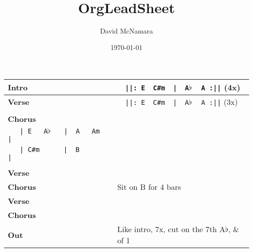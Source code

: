 \documentclass{LeadMemo}
\title{OrgLeadSheet}
\author{David McNamara}
\date{\today}
\begin{document}
\maketitle

\def\arraystretch{2.5}
\begin{tabular}[h]{ p{}  p{}  }
    \huge\textbf{Intro\vfill}         &\large\verb!  ||: E  C#m  |  A!$\flat\,$\large\verb!  A :||! (4x)\\
    \hline
    \huge\textbf{Verse\vfill}         &\large\verb!  ||: E  C#m  |  A!$\flat\,$\large\verb!  A :||! (3x)\\
    \\  
    \huge\textbf{Chorus\vfill}         & \begin{minipage}[t]{\textwidth}
    \large\verb!  ||: E  C#m  |  A!$\flat\,$\large\verb!  A   :||! (3x)\\
    \large\verb!   | E   A!$\flat\,$\large\verb!   |  A   Am   |!\\
    \large\verb!   | C#m      |  B        |! \\
    \end{minipage}\\
    \hline
    \huge\textbf{Verse\vfill} & \\
   \huge\textbf{Chorus\vfill} &  \large{Sit on B for 4 bars} \\
    \huge\textbf{Verse\vfill} & \\
   \huge\textbf{Chorus\vfill} & \\
      \huge\textbf{Out\vfill} & \large{Like intro, 7x, cut on the 7th A$\flat$}, \& of 1  \\
  \end{tabular}
\def\arraystretch{1.0}
\end{document}
